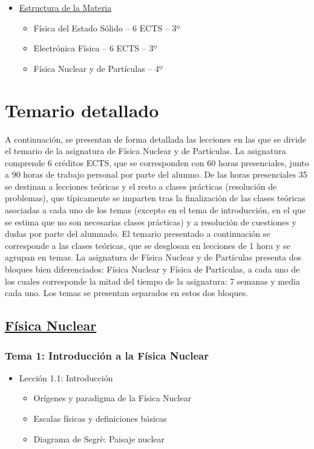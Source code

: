 \documentclass[a4paper,12pt,twoside]{article}
\begin{document}
\begin{itemize}
\item \underline{Estructura de la Materia}
\begin{itemize}
\item Física del Estado Sólido -- 6 ECTS -- 3º
\item Electrónica Física -- 6 ECTS -- 3º
\item Física Nuclear y de Partículas -- 4º
\end{itemize}
\end{itemize}

\section{Temario detallado \label{sec:temario}}

A continuación, se presentan de forma detallada las lecciones en las que se divide el temario de la asignatura de Física Nuclear y de Partículas. La asignatura comprende 6 créditos ECTS, que se corresponden con 60 horas presenciales, junto a 90 horas de trabajo personal por parte del alumno. De las horas presenciales 35 se destinan a lecciones teóricas y el resto a clases prácticas (resolución de problemas), que típicamente se imparten tras la finalización de las clases teóricas asociadas a cada uno de los temas (excepto en el tema de introducción, en el que se estima que no son necesarias clases prácticas) y a resolución de cuestiones y dudas por parte del alumnado. El temario presentado a continuación se corresponde a las clases teóricas, que se desglosan en lecciones de 1 hora y se agrupan en temas. La asignatura de Física Nuclear y de Partículas presenta dos bloques bien diferenciados: Física Nuclear y Física de Partículas, a cada uno de los cuales corresponde la mitad del tiempo de la asignatura: 7 semanas y media cada uno. Los temas se presentan separados en estos dos bloques.

\subsection*{\underline{Física Nuclear}}

\subsubsection*{Tema 1: Introducción a la Física Nuclear}

\begin{itemize}
\item Lección 1.1: Introducción
\begin{itemize}
\item Orígenes y paradigma de la Física Nuclear
\item Escalas físicas y definiciones básicas
\item Diagrama de Segrè: Paisaje nuclear
\end{itemize}
\end{itemize}
\end{document}
